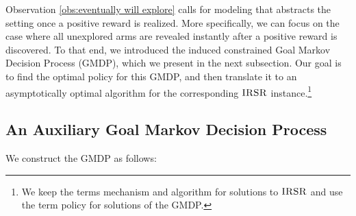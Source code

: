 Observation \ref{obs:eventually will explore} calls for modeling that abstracts the setting once a positive reward is realized. More specifically, we can focus on the case where all unexplored arms are revealed instantly after a positive reward is discovered. To that end, we introduced the induced constrained Goal Markov Decision Process (GMDP), which we present in the next subsection. Our goal is to find the optimal policy for this GMDP, and then translate it to an asymptotically optimal algorithm for the corresponding $\textsc{IRSR}$ instance.\footnote{We keep the terms mechanism and algorithm for solutions to $\textsc{IRSR}$ and use the term policy for solutions of the GMDP.} 


\subsection{An Auxiliary Goal Markov Decision Process}\label{subsec:aux GMDP}
We construct the GMDP as follows:
